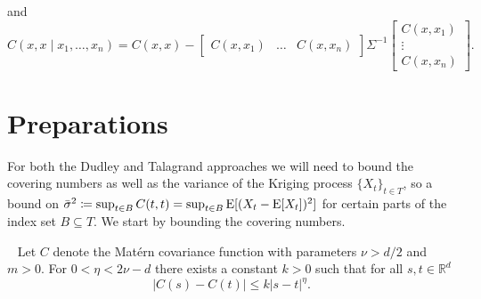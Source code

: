 and 
\[
    C(x,x \mid x_{1}, \dots, x_{n}) = 
    C(x,x) 
    - 
    \begin{bmatrix}
    C(x,x_{1}) & \dots & C(x,x_{n}) 
    \end{bmatrix}
    \Sigma^{-1}
    \begin{bmatrix}
    C(x,x_{1}) \\
    \vdots \\
    C(x,x_{n}) 
    \end{bmatrix}.
\]
%
%
\section{Preparations}
%
For both the Dudley and Talagrand approaches we will need to bound the covering numbers as well as the variance of the Kriging process $\{ X_{t} \}_{t \in T}$, so a bound on \( \bar{\sigma}^2 \coloneqq \sup_{t \in B} C(t,t)  = \sup_{t \in B} \operatorname*{E}[(X_{t} - \operatorname*{E}[X_{t}])^2] \) for certain parts of the index set $B \subseteq T$.
We start by bounding the covering numbers.
\begin{lemma}
    ~\label{lemma:matern_hoelder}
    Let $C$ denote the Matérn covariance function with parameters \( \nu> d/2 \) and \( m > 0 \).
    For \( 0 < \eta < 2\nu-d \) there exists  a constant \( k >0 \) such that for all \( s,t \in \mathbb{R}^{d} \) 
    \[
        \lvert C(s) -C(t) \rvert \leq k \lvert s-t \rvert^{\eta}.
    \]
\end{lemma}
